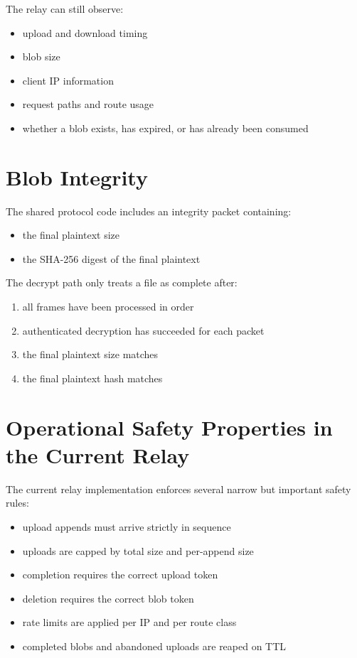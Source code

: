 \documentclass[11pt,a4paper]{report}
\begin{document}
The relay can still observe:

\begin{itemize}[leftmargin=1.5cm]
    \item upload and download timing
    \item blob size
    \item client IP information
    \item request paths and route usage
    \item whether a blob exists, has expired, or has already been consumed
\end{itemize}

\section{Blob Integrity}

The shared protocol code includes an integrity packet containing:

\begin{itemize}[leftmargin=1.5cm]
    \item the final plaintext size
    \item the SHA-256 digest of the final plaintext
\end{itemize}

The decrypt path only treats a file as complete after:

\begin{enumerate}
    \item all frames have been processed in order
    \item authenticated decryption has succeeded for each packet
    \item the final plaintext size matches
    \item the final plaintext hash matches
\end{enumerate}

\section{Operational Safety Properties in the Current Relay}

The current relay implementation enforces several narrow but important safety rules:

\begin{itemize}[leftmargin=1.5cm]
    \item upload appends must arrive strictly in sequence
    \item uploads are capped by total size and per-append size
    \item completion requires the correct upload token
    \item deletion requires the correct blob token
    \item rate limits are applied per IP and per route class
    \item completed blobs and abandoned uploads are reaped on TTL
\end{itemize}
\end{document}
